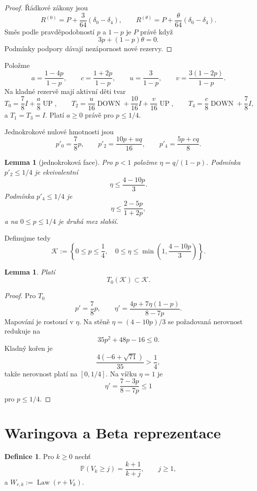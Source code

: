 \documentclass[11pt,a4paper]{article}
\newtheorem{lemma}[theorem]{Lemma}
\theoremstyle{definition}
\newtheorem{definition}[theorem]{Definice}
\theoremstyle{remark}
\theoremstyle{plain}
\newcommand{\Prb}{\mathbb P}
\newcommand{\cK}{\mathcal K}
\newcommand{\Law}{\operatorname{Law}}
\newcommand{\DOWN}{\operatorname{DOWN}}
\newcommand{\UP}{\operatorname{UP}}
\begin{document}
\begin{proof}
Řádkové zákony jsou
\[
R^{(0)}=P+\frac3{64}(\delta_0-\delta_4),
\qquad
R^{(\theta)}=P+\frac{\theta}{64}(\delta_0-\delta_4).
\]
Směs podle pravděpodobností $p$ a $1-p$ je $P$ právě když
\[
3p+(1-p)\theta=0.
\]
Podmínky podpory dávají nezápornost nové rezervy.
\end{proof}

Položme
\[
a=\frac{1-4p}{1-p},\qquad
c=\frac{1+2p}{1-p},\qquad
u=\frac3{1-p},\qquad
v=\frac{3(1-2p)}{1-p}.
\tag{12}
\]
Na kladné rezervě mají aktivní děti tvar
\[
T_0=\frac78I+\frac a8\UP,
\qquad
T_2=\frac u{16}\DOWN+\frac{10}{16}I+\frac v{16}\UP,
\qquad
T_4=\frac c8\DOWN+\frac78I,
\tag{13}
\]
a $T_1=T_3=I$. Platí $a\ge0$ právě pro $p\le1/4$.

Jednokrokové nulové hmotnosti jsou
\[
p'_0=\frac78p,\qquad
p'_2=\frac{10p+uq}{16},\qquad
p'_4=\frac{5p+cq}{8}.
\tag{14}
\]

\begin{lemma}[jednokroková face]
Pro $p<1$ položme $\eta=q/(1-p)$. Podmínka $p'_2\le1/4$ je ekvivalentní
\[
\eta\le\frac{4-10p}{3}.
\]
Podmínka $p'_4\le1/4$ je
\[
\eta\le\frac{2-5p}{1+2p},
\]
a na $0\le p\le1/4$ je druhá mez slabší.
\end{lemma}

Definujme tedy
\[
\cK:=
\left\{
0\le p\le\frac14,\quad
0\le\eta\le
\min\left(1,\frac{4-10p}{3}\right)
\right\}.
\tag{15}
\]

\begin{lemma}
Platí
\[
T_0(\cK)\subset\cK.
\tag{16}
\]
\end{lemma}

\begin{proof}
Pro $T_0$
\[
p'=\frac78p,\qquad
\eta'=
\frac{4p+7\eta(1-p)}{8-7p}.
\]
Mapování je rostoucí v $\eta$. Na stěně
$\eta=(4-10p)/3$ se požadovaná nerovnost redukuje na
\[
35p^2+48p-16\le0.
\]
Kladný kořen je
\[
\frac{4(-6+\sqrt{71})}{35}>\frac14,
\]
takže nerovnost platí na $[0,1/4]$.
Na víčku $\eta=1$ je
\[
\eta'=\frac{7-3p}{8-7p}\le1
\]
pro $p\le1/4$.
\end{proof}

\section{Waringova a Beta reprezentace}

\begin{definition}
Pro $k\ge0$ nechť
\[
\Prb(V_k\ge j)=\frac{k+1}{k+j},
\qquad j\ge1,
\]
a $W_{r,k}:=\Law(r+V_k)$.
\end{definition}
\end{document}
